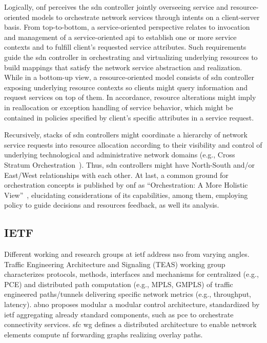 Logically, \gls{onf} perceives the \gls{sdn} controller jointly overseeing service and resource-oriented models to orchestrate network services through intents on a client-server basis. From top-to-bottom, a service-oriented perspective relates to invocation and management of a service-oriented \gls{api} to establish one or more service contexts and to fulfill client's requested service attributes. 
Such requirements guide the \gls{sdn} controller in orchestrating and virtualizing underlying resources to build mappings that satisfy the network service abstraction and realization. While in a bottom-up view, a resource-oriented model consists of \gls{sdn} controller exposing underlying resource contexts so clients might query information and request services on top of them. In accordance, resource alterations might imply in reallocation or exception handling of service behavior, which might be contained in policies specified by client's specific attributes in a service request.

Recursively, stacks of \gls{sdn} controllers might coordinate a hierarchy of network service requests into resource allocation according to their visibility and control of underlying technological and administrative network domains (e.g., Cross Stratum Orchestration~\cite{ONF:CSO:2017}). Thus, \gls{sdn} controllers might have North-South and/or East/West relationships with each other. At last, a common ground for orchestration concepts is published by \gls{onf} as ``Orchestration: A More Holistic View''~\cite{ONF:SDN:2016}, elucidating considerations of its capabilities, among them, employing policy to guide decisions and resources feedback, as well its analysis.  

\subsection{IETF}
Different working and research groups at \gls{ietf} address \gls{nso} from varying angles. Traffic Engineering Architecture and Signaling (TEAS) working group characterizes protocols, methods, interfaces and mechanisms for centralized (e.g., PCE) and distributed path computation (e.g., MPLS, GMPLS) of traffic engineered paths/tunnels delivering specific network metrics (e.g., throughput, latency).  
\gls{abno} proposes modular a modular control architecture, standardized by \gls{ietf} aggregating already standard components, such as \gls{pce} to orchestrate connectivity services.  
\gls{sfc} \gls{wg} defines a distributed architecture to enable network elements compute \gls{nf} forwarding graphs realizing overlay paths.
 
